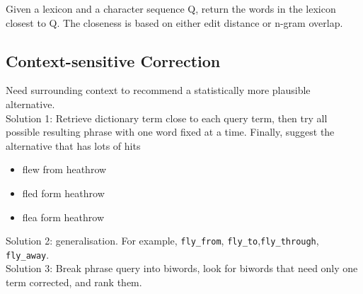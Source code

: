 \begin{multicols*}{2}
\noindent Given a lexicon and a character sequence Q, return the words in the lexicon closest to Q. The closeness is based on either edit distance or n-gram overlap. 

\subsection{Context-sensitive Correction}

\noindent Need surrounding context to recommend a statistically more plausible alternative. \\

\noindent Solution 1: Retrieve dictionary term close to each query term, then try all possible resulting phrase with one word fixed at a time. Finally, suggest the alternative that has lots of hits
\begin{itemize}
    \item flew from heathrow
    \item fled form heathrow
    \item flea form heathrow
\end{itemize}

\noindent Solution 2: generalisation. For example, \verb|fly_from|, \verb|fly_to|,\verb|fly_through|, \verb|fly_away|. \\

\noindent Solution 3: Break phrase query into biwords, look for biwords that need only one term corrected, and rank them. 

\end{multicols*}
